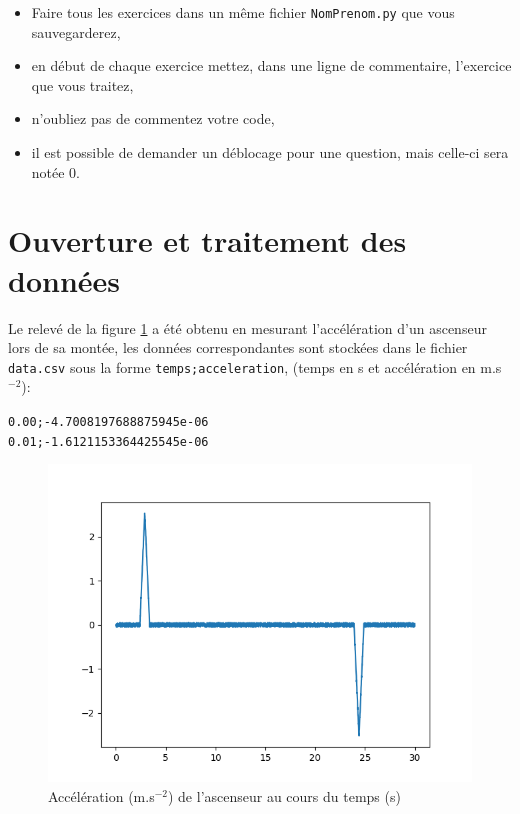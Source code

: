 \documentclass[a4paper,12pt]{article}
\begin{document}

 \begin{center}
  \begin{large}
  \end{large}
 \end{center}

\begin{boxedminipage}{.9\textwidth} 
\begin{itemize}
 \item Faire tous les exercices dans un même fichier \texttt{NomPrenom.py} que vous sauvegarderez,
 \item en début de chaque exercice mettez, dans une ligne de commentaire, l'exercice que vous traitez,
 \item n'oubliez pas de commentez votre code,
 \item il est possible de demander un déblocage pour une question, mais celle-ci sera notée 0.
\end{itemize}
\end{boxedminipage}

\section*{Ouverture et traitement des données}
\noi Le relevé de la figure \ref{fig1} a été obtenu en mesurant l'accélération d'un ascenseur lors de sa montée, les données correspondantes sont stockées dans le fichier \verb?data.csv? sous la forme \verb?temps;acceleration?, (temps en s et accélération en m.s$^{-2}$):
\begin{center}
\verb?0.00;-4.7008197688875945e-06?\\
\verb?0.01;-1.6121153364425545e-06?
\end{center}

\begin{figure}[!ht]
 \begin{center}
 \includegraphics[width=0.5\linewidth]{Code/figure1}
 \caption{Accélération (m.s$^{-2}$) de l'ascenseur au cours du temps (s)}
  \label{fig1}
 \end{center}
\end{figure}
\end{document}
